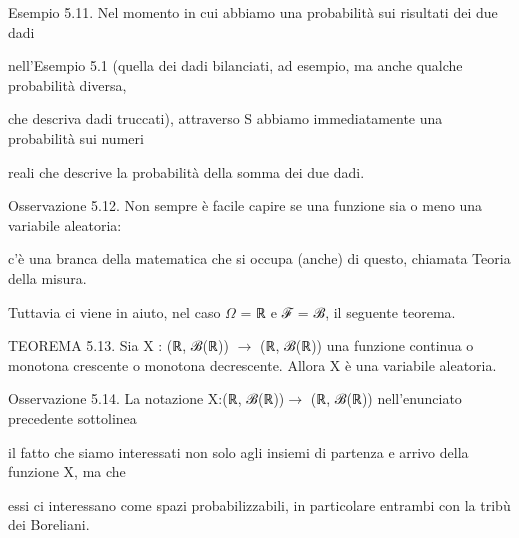 \documentclass[a4paper,portrait,12pt]{article}
\begin{document}
\begin{flushleft}
Esempio 5.11. Nel momento in cui abbiamo una probabilit\`{a} sui risultati dei due dadi
\end{flushleft}


\begin{flushleft}
nell'Esempio 5.1 (quella dei dadi bilanciati, ad esempio, ma anche qualche probabilit\`{a} diversa,
\end{flushleft}


\begin{flushleft}
che descriva dadi truccati), attraverso S abbiamo immediatamente una probabilit\`{a} sui numeri
\end{flushleft}


\begin{flushleft}
reali che descrive la probabilit\`{a} della somma dei due dadi.
\end{flushleft}


\begin{flushleft}
Osservazione 5.12. Non sempre \`{e} facile capire se una funzione sia o meno una variabile aleatoria:
\end{flushleft}


\begin{flushleft}
c'\`{e} una branca della matematica che si occupa (anche) di questo, chiamata Teoria della misura.
\end{flushleft}


\begin{flushleft}
Tuttavia ci viene in aiuto, nel caso $\Omega$ = ℝ e ℱ = ℬ, il seguente teorema.
\end{flushleft}


\begin{flushleft}
TEOREMA 5.13. Sia X : (ℝ, ℬ(ℝ)) $\rightarrow$ (ℝ, ℬ(ℝ)) una funzione continua o monotona crescente o monotona decrescente. Allora X \`{e} una variabile aleatoria.
\end{flushleft}


\begin{flushleft}
Osservazione 5.14. La notazione X:(ℝ, ℬ(ℝ))$\rightarrow$ (ℝ, ℬ(ℝ)) nell'enunciato precedente sottolinea
\end{flushleft}


\begin{flushleft}
il fatto che siamo interessati non solo agli insiemi di partenza e arrivo della funzione X, ma che
\end{flushleft}


\begin{flushleft}
essi ci interessano come spazi probabilizzabili, in particolare entrambi con la tribù dei Boreliani.
\end{flushleft}
\end{document}

